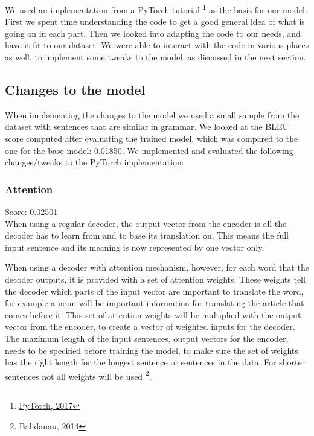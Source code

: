 \documentclass[11pt]{article}
\begin{document}
We used an implementation from a PyTorch tutorial \footnote[6]{\href{https://pytorch.org/tutorials/intermediate/seq2seq_translation_tutorial.html}{PyTorch, 2017}} as the basis for our model. First we spent time understanding the code to get a good general idea of what is going on in each part. Then we looked into adapting the code to our needs, and have it fit to our dataset. We were able to interact with the code in various places as well, to implement some tweaks to the model, as discussed in the next section.

\subsection{Changes to the model}
When implementing the changes to the model we used a small sample from the dataset with sentences that are similar in grammar. We looked at the BLEU score computed after evaluating the trained model, which was compared to the one for the base model: 0.01850. We implemented and evaluated the following changes/tweaks to the PyTorch implementation:

\subsubsection*{Attention}
Score: 0.02501
\\When using a regular decoder, the output vector from the encoder is all the decoder has to learn from and to base its translation on. This means the full input sentence and its meaning is now represented by one vector only.

When using a decoder with attention mechanism, however, for each word that the decoder outputs, it is provided with a set of attention weights. These weights tell the decoder which parts of the input vector are important to translate the word, for example a noun will be important information for translating the article that comes before it. This set of attention weights will be multiplied with the output vector from the encoder, to create a vector of weighted inputs for the decoder. The maximum length of the input sentences, output vectors for the encoder, needs to be specified before training the model, to make sure the set of weights has the right length for the longest sentence or sentences in the data. For shorter sentences not all weights will be used \footnote[7]{Bahdanau, 2014}. 
\end{document}
